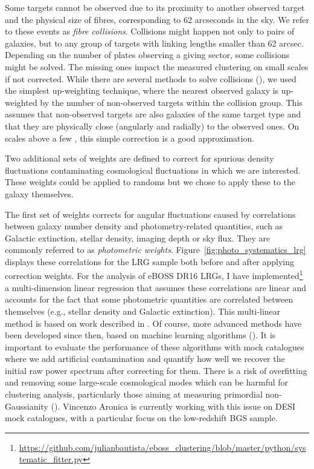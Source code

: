 Some targets cannot be observed due to 
its proximity to another observed target and the physical size of fibres, 
corresponding to 62 arcseconds in the sky. 
We refer to these events as \emph{fibre collisions}. 
Collisions might happen not only to pairs of galaxies, but to any group of targets with 
linking lengths smaller than 62 arcsec. Depending on the number of plates observing 
a giving sector, some collisions might be solved. The missing ones  
impact the measured clustering on small scales if not corrected. 
While there are several methods to solve collisions 
(\cite{guoNewMethodCorrect2012, bianchiUnbiasedClusteringEstimation2017}),
we used the simplest up-weighting technique, where the nearest observed galaxy 
is up-weighted by the number of non-observed targets within the collision group. 
This assumes that non-observed targets are also galaxies of the same target type and 
that they are physically close (angularly and radially) to the observed ones.
On scales above a few \hmpc, this simple correction is a good approximation. 

Two additional sets of weights are defined to correct for spurious density 
fluctuations contaminating cosmological fluctuations in which we are interested. 
These weights could be applied to randoms but we chose to apply these to the 
galaxy themselves. 

The first set of weights corrects for angular fluctuations caused 
by correlations between galaxy number density and photometry-related quantities,
such as Galactic extinction, stellar density, imaging depth or sky flux.
They are commonly referred to as \emph{photometric weights}. 
Figure~\ref{fig:photo_systematics_lrg} displays these correlations 
for the LRG sample both before and after applying correction weights. 
For the analysis of eBOSS DR16 LRGs, I have 
implemented\footnote{\url{https://github.com/julianbautista/eboss_clustering/blob/master/python/systematic_fitter.py}} 
a multi-dimension linear regression that assumes these correlations are linear and 
accounts for the fact that some photometric quantities are correlated between themselves 
(e.g., stellar density and Galactic extinction).
This multi-linear method is based on work described in \cite{prakashSDSSIVExtendedBaryon2016}.
Of course, more advanced methods have been developed since then, based on 
machine learning algorithms 
(\cite{rezaieImprovingGalaxyClustering2020, chaussidonAngularClusteringProperties2021}).
It is important to evaluate the performance of these algorithms with mock catalogues
where we add artificial contamination 
and quantify how well we recover the initial raw power spectrum after correcting for them. 
There is a risk of overfitting and removing some large-scale cosmological modes which 
can be harmful for clustering analysis, particularly those aiming at measuring 
primordial non-Gaussianity 
(\cite{rezaiePrimordialNonGaussianityCompleted2021, muellerClusteringGalaxiesCompleted2021}).
Vincenzo Aronica is currently working with this issue on DESI mock catalogues, 
with a particular focus on the low-redshift BGS sample. 



